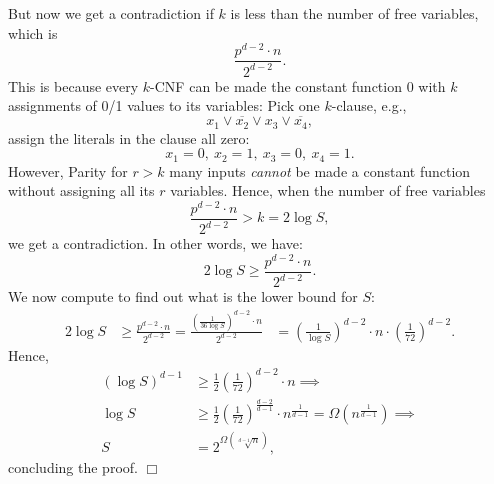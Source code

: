 But now we get a contradiction if \( k \) is less than the number of free variables, which is 
\[
\frac{p^{d-2} \cdot n}{2^{d-2}}.
\]
This is because every \( k \)-CNF can be made the  constant function 0 with \( k \) assignments of 0/1 values to its variables: Pick one \( k \)-clause, e.g.,
\[
x_1 \lor \overline{x_2} \lor x_3 \lor \overline{x_4},
\]
assign the literals in the clause all zero: 
\[
x_1 = 0, \ x_2 = 1, \ x_3 = 0, \ x_4 = 1.
\]
However, Parity for \( r > k \) many inputs \emph{cannot} be made a constant function without assigning all its \( r \) variables. Hence, when the number of free variables
\[
\frac{p^{d-2} \cdot n}{2^{d-2}} > k = 2 \log S,
\]
we get  a contradiction.
In other words, we have:
\[
2 \log S \geq \frac{p^{d-2} \cdot n}{2^{d-2}}.
\]
We now compute to find out what is the lower bound for $S$:
\begin{align*}
    2 \log S &\ge  \frac{p^{d-2} \cdot n}{2^{d-2}} 
 = \frac{\left(\frac{1}{36 \log S}\right)^{d-2} \cdot n}{2^{d-2}} 
    & = \left(\frac{1}{\log S}\right)^{d-2} \cdot n \cdot \left(\frac{1}{72}\right)^{d-2}.
\end{align*}
Hence, 
\begin{align*}
    \left(\log S\right)^{d-1} &\ge \frac{1}{2} \left(\frac{1}{72}\right)^{d-2} \cdot n \implies \\
    \log S &\ge \frac{1}{2} \left(\frac{1}{72}\right)^{\frac{d-2}{d-1}} \cdot n^{\frac{1}{d-1}}
= \Omega \left(n^{\frac{1}{d-1}}\right)  \implies \\
     S &=  2^{\Omega ({\sqrt[d-1]{n}})},
\end{align*}
concluding the proof. 
 \hfill $\Box$

% 
% 
% 
% 
% 
% 
% 
% 
% 
% 
% 
% 
% 
% 
% 
% 
 
